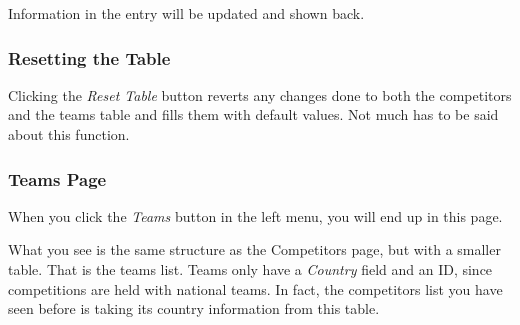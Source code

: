 \documentclass[a4paper,10pt,english]{sphinxmanual}
\begin{document}
Information in the entry will be updated and shown back.
\begin{quote}

\end{quote}


\subsubsection{Resetting the Table}
\label{user/member4:resetting-the-table}
Clicking the \emph{Reset Table} button reverts any changes done to both the competitors and the teams table and fills them with default values. Not much has to be said about this function.


\subsubsection{Teams Page}
\label{user/member4:teams-page}
When you click the \emph{Teams} button in the left menu, you will end up in this page.
\begin{quote}

\end{quote}

What you see is the same structure as the Competitors page, but with a smaller table. That is the teams list. Teams only have a \emph{Country} field and an ID, since competitions are held with national teams. In fact, the competitors list you have seen before is taking its country information from this table.
\end{document}
